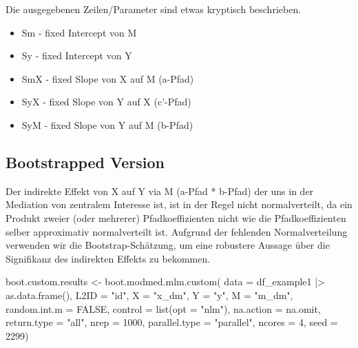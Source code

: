 \documentclass[
  letterpaper,
  DIV=11,
  numbers=noendperiod]{scrreprt}
\newenvironment{Shaded}{\begin{snugshade}}{\end{snugshade}}
\newcommand{\AttributeTok}[1]{\textcolor[rgb]{0.40,0.45,0.13}{#1}}
\newcommand{\ConstantTok}[1]{\textcolor[rgb]{0.56,0.35,0.01}{#1}}
\newcommand{\DecValTok}[1]{\textcolor[rgb]{0.68,0.00,0.00}{#1}}
\newcommand{\FunctionTok}[1]{\textcolor[rgb]{0.28,0.35,0.67}{#1}}
\newcommand{\NormalTok}[1]{\textcolor[rgb]{0.00,0.23,0.31}{#1}}
\newcommand{\OtherTok}[1]{\textcolor[rgb]{0.00,0.23,0.31}{#1}}
\newcommand{\SpecialCharTok}[1]{\textcolor[rgb]{0.37,0.37,0.37}{#1}}
\newcommand{\StringTok}[1]{\textcolor[rgb]{0.13,0.47,0.30}{#1}}
\providecommand{\tightlist}{%
  \setlength{\itemsep}{0pt}\setlength{\parskip}{0pt}}\usepackage{longtable,booktabs,array}
\begin{document}
Die ausgegebenen Zeilen/Parameter sind etwas kryptisch beschrieben.

\begin{itemize}
\tightlist
\item
  Sm - fixed Intercept von M
\item
  Sy - fixed Intercept von Y
\item
  SmX - fixed Slope von X auf M (a-Pfad)
\item
  SyX - fixed Slope von Y auf X (c'-Pfad)
\item
  SyM - fixed Slope von Y auf M (b-Pfad)
\end{itemize}

\subsection{Bootstrapped Version}\label{bootstrapped-version}

Der indirekte Effekt von X auf Y via M (a-Pfad * b-Pfad) der uns in der
Mediation von zentralem Interesse ist, ist in der Regel nicht
normalverteilt, da ein Produkt zweier (oder mehrerer) Pfadkoeffizienten
nicht wie die Pfadkoeffizienten selber approximativ normalverteilt ist.
Aufgrund der fehlenden Normalverteilung verwenden wir die
Bootstrap-Schätzung, um eine robustere Aussage über die Signifikanz des
indirekten Effekts zu bekommen.

\begin{Shaded}
\begin{Highlighting}[]
\NormalTok{boot.custom.results }\OtherTok{\textless{}{-}} \FunctionTok{boot.modmed.mlm.custom}\NormalTok{(}
  \AttributeTok{data =}\NormalTok{ df\_example1 }\SpecialCharTok{|\textgreater{}} \FunctionTok{as.data.frame}\NormalTok{(),}
  \AttributeTok{L2ID =} \StringTok{"id"}\NormalTok{,}
  \AttributeTok{X =} \StringTok{"x\_dm"}\NormalTok{,}
  \AttributeTok{Y =} \StringTok{"y"}\NormalTok{,}
  \AttributeTok{M =} \StringTok{"m\_dm"}\NormalTok{,}
  \AttributeTok{random.int.m =} \ConstantTok{FALSE}\NormalTok{,}
  \AttributeTok{control =} \FunctionTok{list}\NormalTok{(}\AttributeTok{opt =} \StringTok{"nlm"}\NormalTok{),}
  \AttributeTok{na.action =}\NormalTok{ na.omit,}
  \AttributeTok{return.type =} \StringTok{"all"}\NormalTok{,}
  \AttributeTok{nrep =} \DecValTok{1000}\NormalTok{,}
  \AttributeTok{parallel.type =} \StringTok{"parallel"}\NormalTok{,}
  \AttributeTok{ncores =} \DecValTok{4}\NormalTok{,}
  \AttributeTok{seed =} \DecValTok{2299}\NormalTok{)}
\end{Highlighting}
\end{Shaded}
\end{document}
